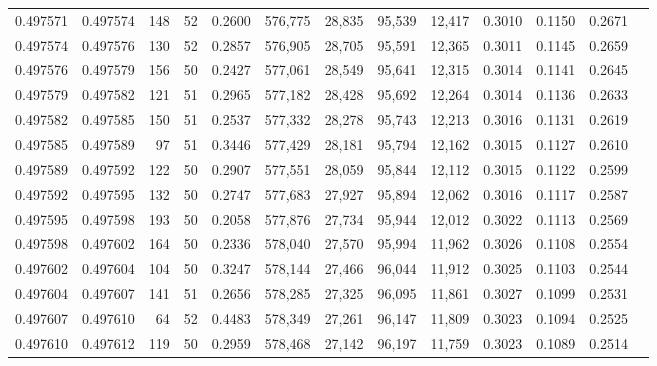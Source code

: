 \begin{tabular}{rrrrrrrrrrrrr}
0.497571 & 0.497574 &   148 &  52 &                                     0.2600 & 576,775 &  28,835 &  95,539 &  12,417 & 0.3010 & 0.1150 & 0.2671 \\
0.497574 & 0.497576 &   130 &  52 &                                     0.2857 & 576,905 &  28,705 &  95,591 &  12,365 & 0.3011 & 0.1145 & 0.2659 \\
0.497576 & 0.497579 &   156 &  50 &                                     0.2427 & 577,061 &  28,549 &  95,641 &  12,315 & 0.3014 & 0.1141 & 0.2645 \\
0.497579 & 0.497582 &   121 &  51 &                                     0.2965 & 577,182 &  28,428 &  95,692 &  12,264 & 0.3014 & 0.1136 & 0.2633 \\
0.497582 & 0.497585 &   150 &  51 &                                     0.2537 & 577,332 &  28,278 &  95,743 &  12,213 & 0.3016 & 0.1131 & 0.2619 \\
0.497585 & 0.497589 &    97 &  51 &                                     0.3446 & 577,429 &  28,181 &  95,794 &  12,162 & 0.3015 & 0.1127 & 0.2610 \\
0.497589 & 0.497592 &   122 &  50 &                                     0.2907 & 577,551 &  28,059 &  95,844 &  12,112 & 0.3015 & 0.1122 & 0.2599 \\
0.497592 & 0.497595 &   132 &  50 &                                     0.2747 & 577,683 &  27,927 &  95,894 &  12,062 & 0.3016 & 0.1117 & 0.2587 \\
0.497595 & 0.497598 &   193 &  50 &                                     0.2058 & 577,876 &  27,734 &  95,944 &  12,012 & 0.3022 & 0.1113 & 0.2569 \\
0.497598 & 0.497602 &   164 &  50 &                                     0.2336 & 578,040 &  27,570 &  95,994 &  11,962 & 0.3026 & 0.1108 & 0.2554 \\
0.497602 & 0.497604 &   104 &  50 &                                     0.3247 & 578,144 &  27,466 &  96,044 &  11,912 & 0.3025 & 0.1103 & 0.2544 \\
0.497604 & 0.497607 &   141 &  51 &                                     0.2656 & 578,285 &  27,325 &  96,095 &  11,861 & 0.3027 & 0.1099 & 0.2531 \\
0.497607 & 0.497610 &    64 &  52 &                                     0.4483 & 578,349 &  27,261 &  96,147 &  11,809 & 0.3023 & 0.1094 & 0.2525 \\
0.497610 & 0.497612 &   119 &  50 &                                     0.2959 & 578,468 &  27,142 &  96,197 &  11,759 & 0.3023 & 0.1089 & 0.2514 \\

\end{tabular}
